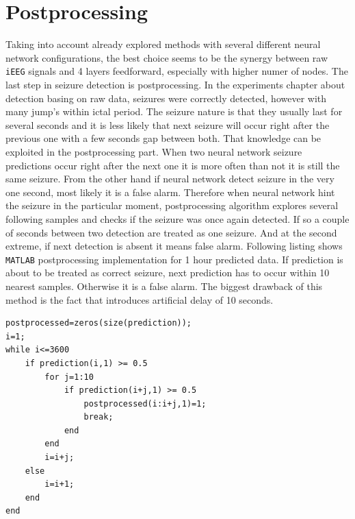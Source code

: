 \chapter{Postprocessing}
\endgroup
Taking into account already explored methods with several different neural network configurations, the best choice seems to be the synergy between raw \verb|iEEG| signals and 4 layers feedforward, especially with higher numer of nodes. The last step in seizure detection is postprocessing. In the experiments chapter about detection basing on raw data, seizures were correctly detected, however with many jump's within ictal period. The seizure nature is that they usually last for several seconds and it is less likely that next seizure will occur right after the previous one with a few seconds gap between both. That knowledge can be exploited in the postprocessing part.
When two neural network seizure predictions occur right after the next one it is more often than not it is still the same seizure. From the other hand if neural network detect seizure in the very one second, most likely it is a false alarm. Therefore when neural network hint the seizure in the particular moment, postprocessing algorithm explores several following samples and checks if the seizure was once again detected. If so a couple of seconds between two detection are treated as one seizure. And at the second extreme, if next detection is absent it means false alarm. Following listing shows \verb|MATLAB| postprocessing implementation for 1 hour predicted data. If prediction is about to be treated as correct seizure, next prediction has to occur within 10 nearest samples. Otherwise it is a false alarm. The biggest drawback of this method is the fact that introduces artificial delay of 10 seconds. 

\begin{lstlisting}[style=custommatlab,frame=single]
postprocessed=zeros(size(prediction));
i=1;
while i<=3600
    if prediction(i,1) >= 0.5
        for j=1:10
            if prediction(i+j,1) >= 0.5
                postprocessed(i:i+j,1)=1;
                break;
            end
        end
        i=i+j;
    else
        i=i+1;
    end
end
\end{lstlisting}

